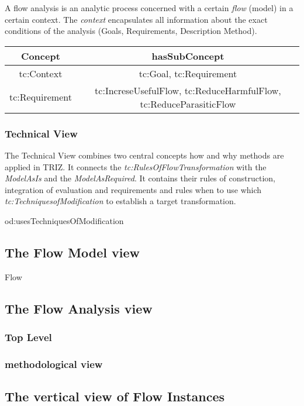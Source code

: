 \documentclass[a4paper,11pt]{article}
\begin{document}
    A flow analysis is an analytic process concerned with a certain \emph{flow}
    (model) in a certain context.  The \emph{context} encapsulates all information
    about the exact conditions of the analysis (Goals, Requirements, Description
    Method). 

    \begin{center}
        \begin{tabular}{|c|c|}\hline
            Concept & hasSubConcept \\\hline
            tc:Context & tc:Goal, tc:Requirement \\
            tc:Requirement & tc:IncreseUsefulFlow, tc:ReduceHarmfulFlow, tc:ReduceParasiticFlow \\\hline 
        \end{tabular}
        \end{center}

    \subsubsection{Technical View}
    The Technical View combines two central concepts how and why methods are applied
    in TRIZ. It connects the \emph{tc:RulesOfFlowTransformation} with the 
    \emph{ModelAsIs} and the \emph{ModelAsRequired}. It contains their rules of 
    construction, integration of evaluation and requirements and rules when to use
    which \emph{tc:TechniquesofModification} to establish a target transformation. 

    od:usesTechniquesOfModification




        \subsection{The Flow Model view}
        Flow 
        \subsection{The Flow Analysis view}
            \subsubsection{Top Level}
            \subsubsection{methodological view}
        \subsection{The vertical view of Flow Instances}
\end{document}
